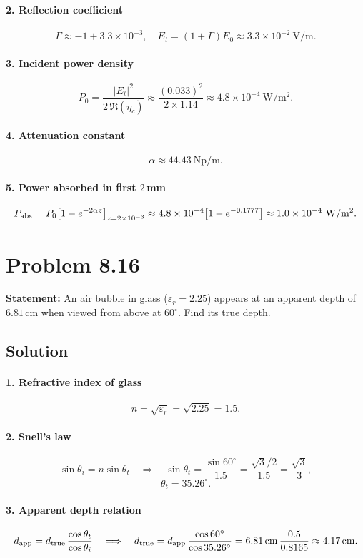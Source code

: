 \paragraph{2. Reflection coefficient}
\[
\Gamma \approx -1 + 3.3\times10^{-3},
\quad
E_t = (1+\Gamma)E_0 \approx 3.3\times10^{-2}\ \mathrm{V/m}.
\]
\paragraph{3. Incident power density}
\[
P_0 = \frac{|E_t|^2}{2\,\Re(\eta_c)} 
    \approx \frac{(0.033)^2}{2\times1.14} 
    \approx 4.8\times10^{-4}\ \mathrm{W/m^2}.
\]
\paragraph{4. Attenuation constant}
\[
\alpha \approx 44.43\ \mathrm{Np/m}.
\]
\paragraph{5. Power absorbed in first $2\,$mm}
\[
P_{\rm abs}
= P_0 \bigl[1 - e^{-2\alpha z}\bigr]_{z=2\times10^{-3}}
\approx 4.8\times10^{-4}\bigl[1 - e^{-0.1777}\bigr]
\approx 1.0\times10^{-4}\ \mathrm{W/m^2}.
\]


\section*{Problem 8.16}
\textbf{Statement:} An air bubble in glass ($\varepsilon_r = 2.25$) appears at an apparent depth of $6.81\,$cm when viewed from above at $60^\circ$. Find its true depth.

\subsection*{Solution}
\paragraph{1. Refractive index of glass}
\[
n = \sqrt{\varepsilon_r} = \sqrt{2.25} = 1.5.
\]
\paragraph{2. Snell’s law}
\[
\sin\theta_i = n \sin\theta_t
\quad\Longrightarrow\quad
\sin\theta_t = \frac{\sin60^\circ}{1.5} = \frac{\sqrt3/2}{1.5} = \frac{\sqrt3}{3},
\]
\[
\theta_t = 35.26^\circ.
\]
\paragraph{3. Apparent depth relation}
\[
d_{\rm app} = d_{\rm true}\,\frac{\cos\theta_t}{\cos\theta_i}
\quad\Longrightarrow\quad
d_{\rm true}
= d_{\rm app}\,\frac{\cos60^\circ}{\cos35.26^\circ}
= 6.81\,\mathrm{cm}\,\frac{0.5}{0.8165}
\approx 4.17\,\mathrm{cm}.
\]

